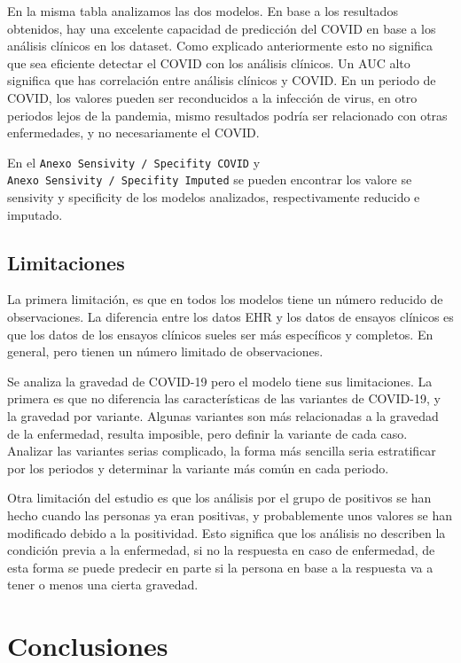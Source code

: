 \documentclass[
]{article}
\begin{document}
En la misma tabla analizamos las dos modelos. En base a los resultados
obtenidos, hay una excelente capacidad de predicción del COVID en base a
los análisis clínicos en los dataset. Como explicado anteriormente esto
no significa que sea eficiente detectar el COVID con los análisis
clínicos. Un AUC alto significa que has correlación entre análisis
clínicos y COVID. En un periodo de COVID, los valores pueden ser
reconducidos a la infección de virus, en otro periodos lejos de la
pandemia, mismo resultados podría ser relacionado con otras
enfermedades, y no necesariamente el COVID.

En el \texttt{Anexo\ Sensivity\ /\ Specifity\ COVID} y
\texttt{Anexo\ Sensivity\ /\ Specifity\ Imputed} se pueden encontrar los
valore se sensivity y specificity de los modelos analizados,
respectivamente reducido e imputado.

\hypertarget{limitaciones}{%
\subsection{Limitaciones}\label{limitaciones}}

La primera limitación, es que en todos los modelos tiene un número
reducido de observaciones. La diferencia entre los datos EHR y los datos
de ensayos clínicos es que los datos de los ensayos clínicos sueles ser
más específicos y completos. En general, pero tienen un número limitado
de observaciones.

Se analiza la gravedad de COVID-19 pero el modelo tiene sus
limitaciones. La primera es que no diferencia las características de las
variantes de COVID-19, y la gravedad por variante. Algunas variantes son
más relacionadas a la gravedad de la enfermedad, resulta imposible, pero
definir la variante de cada caso. Analizar las variantes serias
complicado, la forma más sencilla seria estratificar por los periodos y
determinar la variante más común en cada periodo.

Otra limitación del estudio es que los análisis por el grupo de
positivos se han hecho cuando las personas ya eran positivas, y
probablemente unos valores se han modificado debido a la positividad.
Esto significa que los análisis no describen la condición previa a la
enfermedad, si no la respuesta en caso de enfermedad, de esta forma se
puede predecir en parte si la persona en base a la respuesta va a tener
o menos una cierta gravedad.

\pagebreak

\hypertarget{conclusiones}{%
\section{Conclusiones}\label{conclusiones}}
\end{document}
